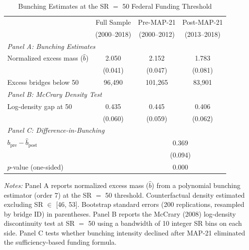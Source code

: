\begin{table}[htbp]
\centering
\caption{Bunching Estimates at the SR $=$ 50 Federal Funding Threshold}
\label{tab:bunching}
\begin{tabular}{lccc}
\hline\hline
 & Full Sample & Pre-MAP-21 & Post-MAP-21 \\
 & (2000--2018) & (2000--2012) & (2013--2018) \\
\hline
\multicolumn{4}{l}{\textit{Panel A: Bunching Estimates}} \\
Normalized excess mass ($\hat{b}$) & 2.050 & 2.152 & 1.783 \\
 & (0.041) & (0.047) & (0.081) \\
Excess bridges below 50 & 96,490 & 101,265 & 83,901 \\
[6pt]
\multicolumn{4}{l}{\textit{Panel B: McCrary Density Test}} \\
Log-density gap at 50 & 0.435 & 0.445 & 0.406 \\
 & (0.060) & (0.059) & (0.062) \\
[6pt]
\multicolumn{4}{l}{\textit{Panel C: Difference-in-Bunching}} \\
$\hat{b}_{\text{pre}} - \hat{b}_{\text{post}}$ & & \multicolumn{2}{c}{0.369} \\
 & & \multicolumn{2}{c}{(0.094)} \\
$p$-value (one-sided) & & \multicolumn{2}{c}{0.000} \\
\hline\hline
\end{tabular}
\begin{tablenotes}[flushleft]\small
\item \textit{Notes:} Panel A reports normalized excess mass ($\hat{b}$) from a polynomial bunching estimator (order 7) at the SR $=$ 50 threshold. Counterfactual density estimated excluding SR $\in$ [46, 53]. Bootstrap standard errors (200 replications, resampled by bridge ID) in parentheses. Panel B reports the McCrary (2008) log-density discontinuity test at SR $=$ 50 using a bandwidth of 10 integer SR bins on each side. Panel C tests whether bunching intensity declined after MAP-21 eliminated the sufficiency-based funding formula.
\end{tablenotes}
\end{table}


